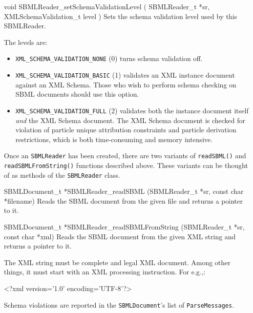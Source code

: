 \documentclass{cekmanual}
\begin{document}
\begin{methoddef}{void SBMLReader\_setSchemaValidationLevel ( SBMLReader\_t *sr,
XMLSchemaValidation\_t level )}
  Sets the schema validation level used by this SBMLReader.

  The levels are:
  \begin{itemize}
    \item \texttt{XML\_SCHEMA\_VALIDATION\_NONE} (0) turns schema
    validation off.

    \item \texttt{XML\_SCHEMA\_VALIDATION\_BASIC} (1) validates an XML
    instance document against an XML Schema.  Those who wish to
    perform schema checking on SBML documents should use this option.

    \item \texttt{XML\_SCHEMA\_VALIDATION\_FULL} (2) validates both
    the instance document itself \emph{and} the XML Schema document.
    The XML Schema document is checked for violation of particle
    unique attribution constraints and particle derivation
    restrictions, which is both time-consuming and memory intensive.
  \end{itemize}
\end{methoddef}


Once an \texttt{SBMLReader} has been created, there are two variants
of \texttt{readSBML()} and \texttt{readSBMLFromString()} functions
described above.  These variants can be thought of as methods of the
\texttt{SBMLReader} class.


\begin{methoddef}{SBMLDocument\_t *SBMLReader\_readSBML (SBMLReader\_t *sr,
const char *filename)}
  Reads the SBML document from the given file and returns a pointer to
  it.
\end{methoddef}

\begin{methoddef}{SBMLDocument\_t *SBMLReader\_readSBMLFromString (SBMLReader\_t *sr, const char *xml)}
  Reads the SBML document from the given XML string and returns a pointer
  to it.

  The XML string must be complete and legal XML document.  Among other
  things, it must start with an XML processing instruction.  For e.g.,:
  \begin{example}
    <?xml version='1.0' encoding='UTF-8'?>
  \end{example}
\end{methoddef}


Schema violations are reported in the \texttt{SBMLDocument}'s list of
\texttt{ParseMessages}.
\end{document}
